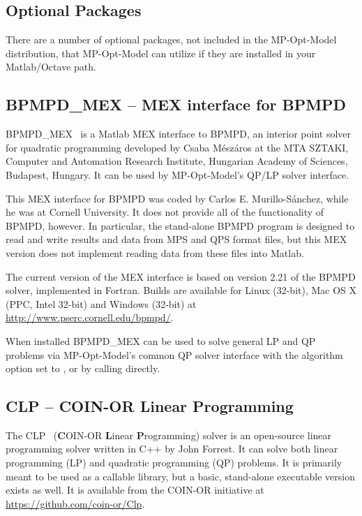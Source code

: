 \documentclass[12pt]{article}
\newcommand{\matlab}[0]{{\sc Matlab}}
\newcommand{\mpom}[0]{\mbox{MP-Opt-Model}}
\newcommand{\clp}[0]{{CLP}}
\newcommand{\code}[1]{{\relsize{-0.5}{\tt{{#1}}}}}  %
\newcommand{\codeq}[1]{\code{\textquotesingle{}#1\textquotesingle}}  %
\numberwithin{equation}{section}
\numberwithin{table}{section}
\numberwithin{figure}{section}
\begin{document}
\begin{appendices}
\clearpage
\section{Optional Packages}
\label{app:optional_packages}

There are a number of optional packages, not included in the \mpom{} distribution, that \mpom{} can utilize if they are installed in your \matlab{}/Octave path.

\subsection{BPMPD\_MEX -- MEX interface for BPMPD}
\label{app:bpmpd}

BPMPD\_MEX~\cite{bpmpdmex,meszaros1996} is a \matlab{} MEX interface to BPMPD, an interior point solver for quadratic programming developed by Csaba M{\'e}sz{\'a}ros at the MTA SZTAKI, Computer and Automation Research Institute, Hungarian Academy of Sciences, Budapest, Hungary. It can be used by \mpom{}'s QP/LP solver interface.

This MEX interface for BPMPD was coded by Carlos E. Murillo-S{\'a}nchez, while he was at Cornell University. It does not provide all of the functionality of BPMPD, however. In particular, the stand-alone BPMPD program is designed to read and write results and data from MPS and QPS format files, but this MEX version does not implement reading data from these files into \matlab{}.

The current version of the MEX interface is based on version 2.21 of the BPMPD solver, implemented in Fortran. Builds are available for Linux (32-bit), Mac OS X (PPC, Intel 32-bit) and Windows (32-bit) at \url{http://www.pserc.cornell.edu/bpmpd/}.

When installed BPMPD\_MEX can be used to solve general LP and QP problems via \mpom{}'s common QP solver interface \code{qps\_master} with the algorithm option set to \codeq{BPMPD}, or by calling \code{qps\_bpmpd} directly.

\subsection{\clp{} -- COIN-OR Linear Programming}
\label{app:clp}

The \clp{}~\cite{clp} ({\bf C}OIN-OR {\bf L}inear {\bf P}rogramming) solver is an open-source linear programming solver written in C++ by John Forrest. It can solve both linear programming (LP) and quadratic programming (QP) problems. It is primarily meant to be used as a callable library, but a basic, stand-alone executable version exists as well. It is available from the COIN-OR initiative at \url{https://github.com/coin-or/Clp}.


\end{appendices}
\end{document}
